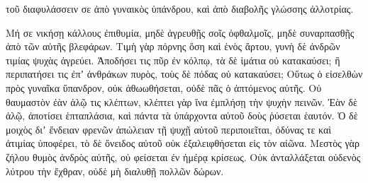 {τοῦ διαφυλάσσειν σε ἀπὸ γυναικὸς ὑπάνδρου, καὶ ἀπὸ διαβολῆς γλώσσης ἀλλοτρίας.
\par }{\PP {}Μή σε νικήσῃ κάλλους ἐπιθυμία, μηδὲ ἀγρευθῇς σοῖς ὀφθαλμοῖς, μηδὲ συναρπασθῇς ἀπὸ τῶν αὐτῆς βλεφάρων.
Τιμὴ γὰρ πόρνης ὅση καὶ ἑνὸς ἄρτου, γυνὴ δὲ ἀνδρῶν τιμίας ψυχὰς ἀγρεύει.
Ἀποδήσει τις πῦρ ἐν κόλπῳ, τὰ δὲ ἱμάτια οὐ κατακαύσει;
ἢ περιπατήσει τις ἐπʼ ἀνθράκων πυρὸς, τοὺς δὲ πόδας οὐ κατακαύσει;
Οὕτως ὁ εἰσελθὼν πρὸς γυναῖκα ὕπανδρον, οὐκ ἀθωωθήσεται, οὐδὲ πᾶς ὁ ἁπτόμενος αὐτῆς.
Οὐ θαυμαστὸν ἐὰν ἁλῷ τις κλέπτων, κλέπτει γὰρ ἵνα ἐμπλήσῃ τὴν ψυχὴν πεινῶν.
Ἐὰν δὲ ἁλῷ, ἀποτίσει ἑπταπλάσια, καὶ πάντα τὰ ὑπάρχοντα αὐτοῦ δοὺς ῥύσεται ἑαυτόν.
Ὁ δὲ μοιχὸς διʼ ἔνδειαν φρενῶν ἀπώλειαν τῇ ψυχῇ αὐτοῦ περιποιεῖται,
ὀδύνας τε καὶ ἀτιμίας ὑποφέρει, τὸ δὲ ὄνειδος αὐτοῦ οὐκ ἐξαλειφθήσεται εἰς τὸν αἰῶνα.
Μεστὸς γὰρ ζήλου θυμὸς ἀνδρὸς αὐτῆς, οὐ φείσεται ἐν ἡμέρᾳ κρίσεως.
Οὐκ ἀνταλλάξεται οὐδενὸς λύτρου τὴν ἔχθραν, οὐδὲ μὴ διαλυθῇ πολλῶν δώρων.

}
